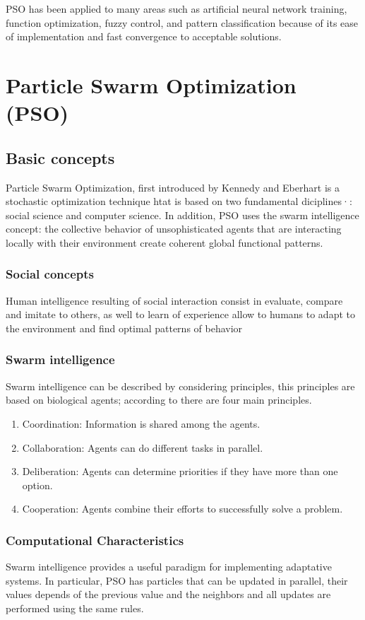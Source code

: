 \documentclass[journal]{IEEEtran}
\begin{document}
PSO has been applied to many areas such as artificial neural network training, function optimization, fuzzy control, and pattern classification because of its ease of implementation and fast convergence to acceptable solutions.


\section{ Particle Swarm Optimization (PSO) }
\subsection{Basic concepts}
Particle Swarm Optimization, first introduced by Kennedy and Eberhart \cite{Kennedy1995} is a stochastic optimization technique htat is based on two fundamental diciplines·\cite{delValle2008}: social science and computer science. In addition, PSO uses the swarm intelligence concept: the collective behavior of unsophisticated agents that are interacting locally with their environment create coherent global functional patterns.

\subsubsection{ Social concepts }
Human intelligence resulting of social interaction consist in evaluate, compare and imitate to others, as well to learn of experience allow to humans to adapt to the environment and find optimal patterns of behavior

\subsubsection{ Swarm intelligence }
Swarm intelligence can be described by considering principles, this principles are based on biological agents; according to \cite{Garnier2007} there are four main principles.
\begin{enumerate}
    \item Coordination: Information is shared among the agents.
    \item Collaboration: Agents can do different tasks in parallel.
    \item Deliberation: Agents can determine priorities if they have more than one option.
    \item Cooperation: Agents combine their efforts to successfully solve a problem.
\end{enumerate}
\subsubsection{ Computational Characteristics }
Swarm intelligence provides a useful paradigm for implementing adaptative systems. In particular, PSO has particles that can be updated in parallel, their values depends of the previous value and the neighbors and all updates are performed using the same rules.
\end{document}
